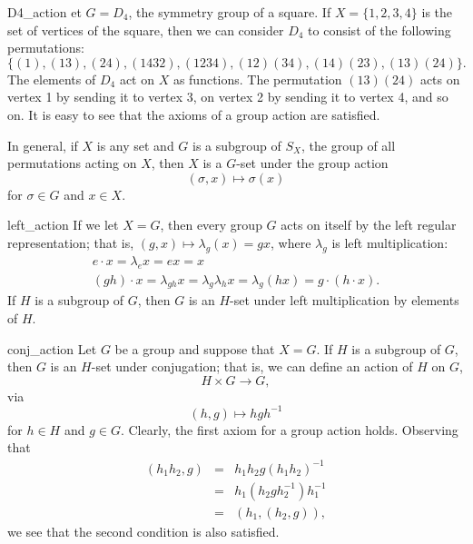 \begin{example}{D4_action}
et $G = D_4$, the symmetry group of a square.  If $X = \{ 1, 2, 3, 4 \}$ is the set of vertices of the square, then we can consider $D_4$
to consist of the following permutations: 
\[
\{ (1), (13), (24), (1432), (1234), (12)(34), (14)(23), (13)(24) \}.
\]
The elements of $D_4$ act on $X$ as functions.  The permutation $(13)(24)$ acts on vertex 1 by sending it to vertex 3, on vertex 2 by
sending it to vertex 4, and so on.  It is easy to see that the  axioms of a group action are satisfied.
\mbox{\hspace{1in}}
\end{example}

\medskip

In general, if $X$ is any set and $G$ is a subgroup of $S_X$, the
group of all permutations acting on $X$, then $X$ is a $G$-set under
the group action 
\[
(\sigma, x) \mapsto \sigma(x)
\]
for $\sigma \in G$ and $x \in X$.
 
 
\begin{example}{left_action}
If we let $X = G$, then every group $G$ acts on itself by the left
regular representation; that is, $(g,x) \mapsto \lambda_g(x) = gx$, 
where  $\lambda_g$ is left multiplication:
\begin{gather*}
e \cdot x = \lambda_e x = ex = x \\
(gh) \cdot x = \lambda_{gh}x = \lambda_g \lambda_h x =
\lambda_g(hx) = g \cdot ( h \cdot x).
\end{gather*}
If $H$ is a subgroup of $G$, then $G$ is an $H$-set under left
multiplication by elements of $H$. 
\end{example}
 
 
\begin{example}{conj_action}
Let $G$ be a group and suppose that $X=G$. If $H$ is a subgroup of
$G$, then $G$ is an $H$-set under {\bfi
conjugation}; that is, we can define an action of
$H$ on $G$, 
\[
H \times G \rightarrow G,
\]
via
\[
(h,g) \mapsto hgh^{-1}
\]
for $h \in H$ and $g \in G$.  Clearly, the first axiom for a group
action holds.  Observing that 
\begin{eqnarray*}
(h_1 h_2, g) &=& h_1 h_2 g (h_1 h_2 )^{-1} \\
&=& h_1( h_2 g h_2^{-1}) h_1^{-1} \\
& = & (h_1, (h_2, g) ),
\end{eqnarray*}
we see that the second condition is also satisfied.
\end{example}
 
